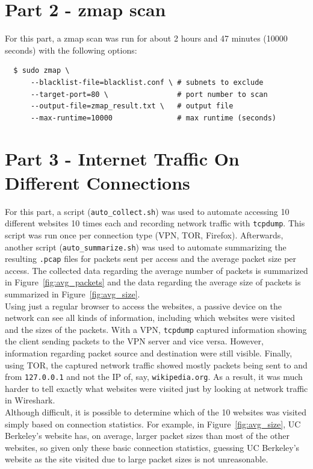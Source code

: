 \documentclass[11pt]{article}
\begin{document}
\section*{Part 2 - zmap scan}
For this part, a zmap scan was run for about 2 hours and 47 minutes (10000 seconds) with the
following options:
\begin{verbatim}
  $ sudo zmap \
      --blacklist-file=blacklist.conf \ # subnets to exclude
      --target-port=80 \                # port number to scan
      --output-file=zmap_result.txt \   # output file
      --max-runtime=10000               # max runtime (seconds)
\end{verbatim}
\section*{Part 3 - Internet Traffic On Different Connections}
For this part, a script (\verb|auto_collect.sh|) was used to automate accessing 10 different
websites 10 times each and recording network traffic with \verb|tcpdump|. This script was run
once per connection type (VPN, TOR, Firefox). Afterwards, another script (\verb|auto_summarize.sh|)
was used to automate summarizing the resulting \verb|.pcap| files for packets sent per access
and the average packet size per access. The collected data regarding the average number of packets
is summarized in Figure~\ref{fig:avg_packets} and the data regarding the average size of packets
is summarized in Figure~\ref{fig:avg_size}.\\
Using just a regular browser to access the websites, a passive device on the network can see
all kinds of information, including which websites were visited and the sizes of the packets. With a
VPN, \verb|tcpdump| captured information showing the client sending packets to the VPN server and
vice versa. However, information regarding packet source and destination were still visible. Finally,
using TOR, the captured network traffic showed mostly packets being sent to and from \verb|127.0.0.1|
and not the IP of, say, \verb|wikipedia.org|. As a result, it was much harder to tell exactly what
websites were visited just by looking at network traffic in Wireshark.\\
Although difficult, it is possible to determine which of the 10 websites was visited simply based on
connection statistics. For example, in Figure~\ref{fig:avg_size}, UC Berkeley's website has, on average,
larger packet sizes than most of the other websites, so given only these basic connection statistics,
guessing UC Berkeley's website as the site visited due to large packet sizes is not unreasonable.
\end{document}
